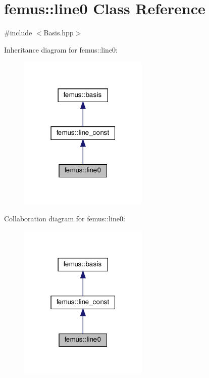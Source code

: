 \hypertarget{classfemus_1_1line0}{}\section{femus\+:\+:line0 Class Reference}
\label{classfemus_1_1line0}


{\ttfamily \#include $<$Basis.\+hpp$>$}



Inheritance diagram for femus\+:\+:line0\+:
\nopagebreak
\begin{figure}[H]
\begin{center}
\leavevmode
\includegraphics[width=175pt]{classfemus_1_1line0__inherit__graph}
\end{center}
\end{figure}


Collaboration diagram for femus\+:\+:line0\+:
\nopagebreak
\begin{figure}[H]
\begin{center}
\leavevmode
\includegraphics[width=175pt]{classfemus_1_1line0__coll__graph}
\end{center}
\end{figure}
